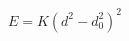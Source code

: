 \documentclass[12pt]{article}
\begin{document}
\thispagestyle{empty}
$$
  E = K (d^2 - d_0^2)^2
$$
\end{document}
